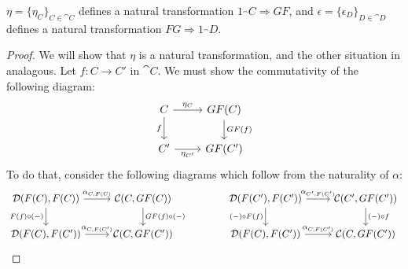 \documentclass[12pt]{article}
\begin{document}
\begin{proposition}
	$\eta=\{\eta_C\}_{C\in\cat{C}}$ defines a natural transformation $1_\cat{C} \Rightarrow GF$, and $\epsilon=\{\epsilon_D\}_{D\in\cat{D}}$ defines a natural transformation $FG \Rightarrow 1_\cat{D}$.
\end{proposition}
\begin{proof}
	We will show that $\eta$ is a natural transformation, and the other situation in analagous. Let $f:C\to C'$ in $\cat{C}$. We must show the commutativity of the following diagram:
	\begin{equation*}
\begin{tikzcd}
C \arrow[d, "f"'] \arrow[r, "\eta_C"] & GF(C) \arrow[d, "GF(f)"] \\
C' \arrow[r, "\eta_{C'}"']            & GF(C')                  
\end{tikzcd}
	\end{equation*}
	To do that, consider the following diagrams which follow from the naturality of $\alpha$:
	\begin{equation*}
\begin{tikzcd}
{\mathcal{D}(F(C), F(C))} \arrow[r, "{\alpha_{C, F(C)}}"] \arrow[d, "F(f)\circ (-)"'] & {\mathcal{C}(C, GF(C))} \arrow[d, "GF(f)\circ (-)"] &  & {\mathcal{D}(F(C'), F(C'))} \arrow[d, "(-)\circ F(f)"'] \arrow[r, "{\alpha_{C', F(C')}}"] & {\mathcal{C}(C', GF(C'))} \arrow[d, "(-)\circ f"] \\
{\mathcal{D}(F(C), F(C'))} \arrow[r, "{\alpha_{C, F(C')}}"]                           & {\mathcal{C}(C, GF(C'))}                            &  & {\mathcal{D}(F(C), F(C'))} \arrow[r, "{\alpha_{C, F(C')}}"]                               & {\mathcal{C}(C, GF(C'))}                         

\end{tikzcd}
\end{equation*}
\end{proof}
\end{document}
